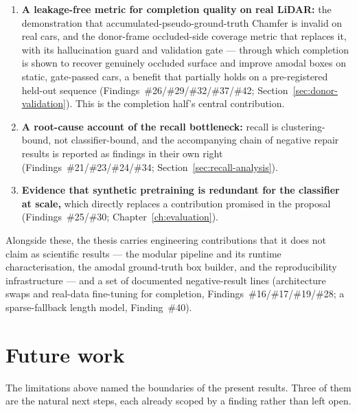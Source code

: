 \begin{enumerate}
  \item \textbf{A leakage-free metric for completion quality on real LiDAR:} the
  demonstration that accumulated-pseudo-ground-truth Chamfer is invalid on real cars, and the
  donor-frame occluded-side coverage metric that replaces it, with its hallucination guard and
  validation gate --- through which completion is shown to recover genuinely occluded surface
  and improve amodal boxes on static, gate-passed cars, a benefit that partially holds on a
  pre-registered held-out sequence (Findings~\#26/\#29/\#32/\#37/\#42; Section~\ref{sec:donor-validation}).
  This is the completion half's central contribution.
  \item \textbf{A root-cause account of the recall bottleneck:} recall is clustering-bound,
  not classifier-bound, and the accompanying chain of negative repair results is reported as
  findings in their own right (Findings~\#21/\#23/\#24/\#34; Section~\ref{sec:recall-analysis}).
  \item \textbf{Evidence that synthetic pretraining is redundant for the classifier at
  scale,} which directly replaces a contribution promised in the proposal
  (Findings~\#25/\#30; Chapter~\ref{ch:evaluation}).
\end{enumerate}

Alongside these, the thesis carries engineering contributions that it does not claim as
scientific results --- the modular pipeline and its runtime characterisation, the amodal
ground-truth box builder, and the reproducibility infrastructure --- and a set of documented
negative-result lines (architecture swaps and real-data fine-tuning for completion,
Findings~\#16/\#17/\#19/\#28; a sparse-fallback length model, Finding~\#40).

\section{Future work}
\label{sec:conclusion-future}

The limitations above named the boundaries of the present results. Three of them are the natural next
steps, each already scoped by a finding rather than left open.

